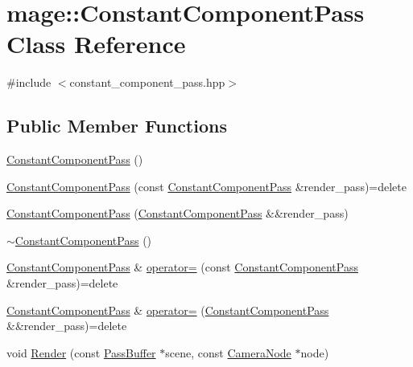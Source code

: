 \hypertarget{classmage_1_1_constant_component_pass}{}\section{mage\+:\+:Constant\+Component\+Pass Class Reference}
\label{classmage_1_1_constant_component_pass}


{\ttfamily \#include $<$constant\+\_\+component\+\_\+pass.\+hpp$>$}

\subsection*{Public Member Functions}
\begin{DoxyCompactItemize}
\item 
\hyperlink{classmage_1_1_constant_component_pass_acd197274863c82c9f1551c7e6171e4c9}{Constant\+Component\+Pass} ()
\item 
\hyperlink{classmage_1_1_constant_component_pass_ac3112acde3a0504febef699873efe1ff}{Constant\+Component\+Pass} (const \hyperlink{classmage_1_1_constant_component_pass}{Constant\+Component\+Pass} \&render\+\_\+pass)=delete
\item 
\hyperlink{classmage_1_1_constant_component_pass_a350d68fd2f8f17797361e7567d0337c7}{Constant\+Component\+Pass} (\hyperlink{classmage_1_1_constant_component_pass}{Constant\+Component\+Pass} \&\&render\+\_\+pass)
\item 
\hyperlink{classmage_1_1_constant_component_pass_aaa94607b422672dab4cb77f129382d1b}{$\sim$\+Constant\+Component\+Pass} ()
\item 
\hyperlink{classmage_1_1_constant_component_pass}{Constant\+Component\+Pass} \& \hyperlink{classmage_1_1_constant_component_pass_a513b83527fdb17a760032b76f3c17012}{operator=} (const \hyperlink{classmage_1_1_constant_component_pass}{Constant\+Component\+Pass} \&render\+\_\+pass)=delete
\item 
\hyperlink{classmage_1_1_constant_component_pass}{Constant\+Component\+Pass} \& \hyperlink{classmage_1_1_constant_component_pass_ab1944cfe6c59d28d34fb6c6d05bd0b96}{operator=} (\hyperlink{classmage_1_1_constant_component_pass}{Constant\+Component\+Pass} \&\&render\+\_\+pass)=delete
\item 
void \hyperlink{classmage_1_1_constant_component_pass_a28834b441a1a06da954d98abb85c62c4}{Render} (const \hyperlink{structmage_1_1_pass_buffer}{Pass\+Buffer} $\ast$scene, const \hyperlink{classmage_1_1_camera_node}{Camera\+Node} $\ast$node)
\end{DoxyCompactItemize}
